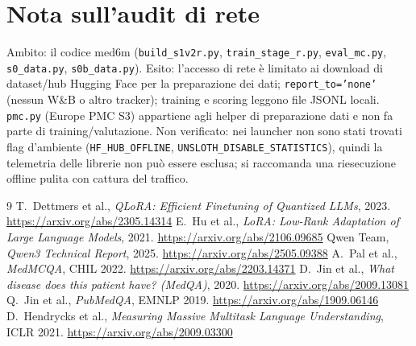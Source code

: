 \documentclass[11pt,a4paper]{article}
\begin{document}
\section{Nota sull'audit di rete}
Ambito: il codice med6m (\texttt{build\_s1v2r.py}, \texttt{train\_stage\_r.py}, \texttt{eval\_mc.py}, \texttt{s0\_data.py}, \texttt{s0b\_data.py}). Esito: l'accesso di rete è limitato ai download di dataset/hub Hugging Face per la preparazione dei dati; \texttt{report\_to='none'} (nessun W\&B o altro tracker); training e scoring leggono file JSONL locali. \texttt{pmc.py} (Europe PMC S3) appartiene agli helper di preparazione dati e non fa parte di training/valutazione. Non verificato: nei launcher non sono stati trovati flag d'ambiente (\texttt{HF\_HUB\_OFFLINE}, \texttt{UNSLOTH\_DISABLE\_STATISTICS}), quindi la telemetria delle librerie non può essere esclusa; si raccomanda una riesecuzione offline pulita con cattura del traffico.
\begin{thebibliography}{9}
 T.~Dettmers et al., \emph{QLoRA: Efficient Finetuning of Quantized LLMs}, 2023. \url{https://arxiv.org/abs/2305.14314}
 E.~Hu et al., \emph{LoRA: Low-Rank Adaptation of Large Language Models}, 2021. \url{https://arxiv.org/abs/2106.09685}
 Qwen Team, \emph{Qwen3 Technical Report}, 2025. \url{https://arxiv.org/abs/2505.09388}
 A.~Pal et al., \emph{MedMCQA}, CHIL 2022. \url{https://arxiv.org/abs/2203.14371}
 D.~Jin et al., \emph{What disease does this patient have? (MedQA)}, 2020. \url{https://arxiv.org/abs/2009.13081}
 Q.~Jin et al., \emph{PubMedQA}, EMNLP 2019. \url{https://arxiv.org/abs/1909.06146}
 D.~Hendrycks et al., \emph{Measuring Massive Multitask Language Understanding}, ICLR 2021. \url{https://arxiv.org/abs/2009.03300}
\end{thebibliography}
\end{document}
